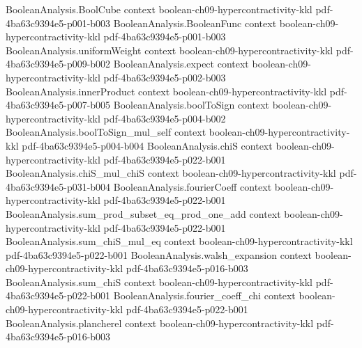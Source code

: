 \begin{theorem}[The $(4/3,2)$-hypercontractive inequality at $\rho=1/\sqrt3$]
\label{BooleanAnalysis.Hypercontractivity.hypercontractivity_4_div_3_2}
\leanok
{}
\proofstep
  {BooleanAnalysis.BoolCube}
  {context}
  {boolean-ch09-hypercontractivity-kkl}
  {pdf-4ba63c9394e5-p001-b003}
\proofstep
  {BooleanAnalysis.BooleanFunc}
  {context}
  {boolean-ch09-hypercontractivity-kkl}
  {pdf-4ba63c9394e5-p001-b003}
\proofstep
  {BooleanAnalysis.uniformWeight}
  {context}
  {boolean-ch09-hypercontractivity-kkl}
  {pdf-4ba63c9394e5-p009-b002}
\proofstep
  {BooleanAnalysis.expect}
  {context}
  {boolean-ch09-hypercontractivity-kkl}
  {pdf-4ba63c9394e5-p002-b003}
\proofstep
  {BooleanAnalysis.innerProduct}
  {context}
  {boolean-ch09-hypercontractivity-kkl}
  {pdf-4ba63c9394e5-p007-b005}
\proofstep
  {BooleanAnalysis.boolToSign}
  {context}
  {boolean-ch09-hypercontractivity-kkl}
  {pdf-4ba63c9394e5-p004-b002}
\proofstep
  {BooleanAnalysis.boolToSign_mul_self}
  {context}
  {boolean-ch09-hypercontractivity-kkl}
  {pdf-4ba63c9394e5-p004-b004}
\proofstep
  {BooleanAnalysis.chiS}
  {context}
  {boolean-ch09-hypercontractivity-kkl}
  {pdf-4ba63c9394e5-p022-b001}
\proofstep
  {BooleanAnalysis.chiS_mul_chiS}
  {context}
  {boolean-ch09-hypercontractivity-kkl}
  {pdf-4ba63c9394e5-p031-b004}
\proofstep
  {BooleanAnalysis.fourierCoeff}
  {context}
  {boolean-ch09-hypercontractivity-kkl}
  {pdf-4ba63c9394e5-p022-b001}
\proofstep
  {BooleanAnalysis.sum_prod_subset_eq_prod_one_add}
  {context}
  {boolean-ch09-hypercontractivity-kkl}
  {pdf-4ba63c9394e5-p022-b001}
\proofstep
  {BooleanAnalysis.sum_chiS_mul_eq}
  {context}
  {boolean-ch09-hypercontractivity-kkl}
  {pdf-4ba63c9394e5-p022-b001}
\proofstep
  {BooleanAnalysis.walsh_expansion}
  {context}
  {boolean-ch09-hypercontractivity-kkl}
  {pdf-4ba63c9394e5-p016-b003}
\proofstep
  {BooleanAnalysis.sum_chiS}
  {context}
  {boolean-ch09-hypercontractivity-kkl}
  {pdf-4ba63c9394e5-p022-b001}
\proofstep
  {BooleanAnalysis.fourier_coeff_chi}
  {context}
  {boolean-ch09-hypercontractivity-kkl}
  {pdf-4ba63c9394e5-p022-b001}
\proofstep
  {BooleanAnalysis.plancherel}
  {context}
  {boolean-ch09-hypercontractivity-kkl}
  {pdf-4ba63c9394e5-p016-b003}

\end{theorem}
